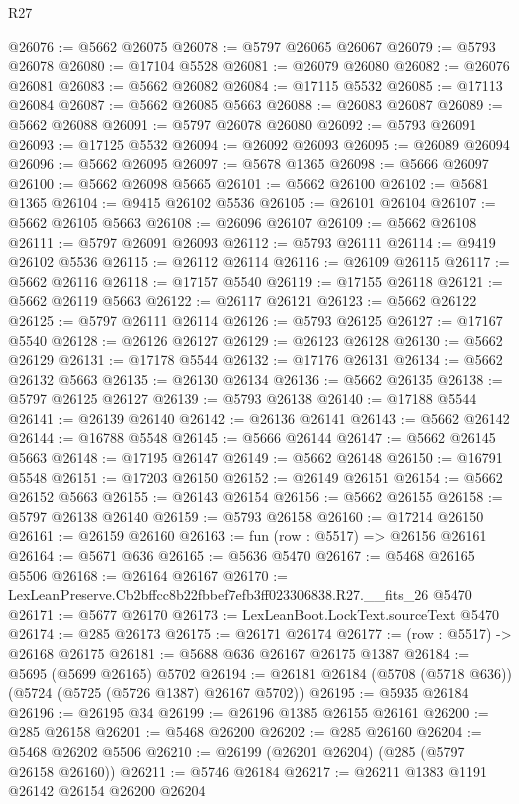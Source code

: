 \begin{lexlean}{R27}
\begin{coremodule}
@26076 := @5662 @26075
@26078 := @5797 @26065 @26067
@26079 := @5793 @26078
@26080 := @17104 @5528
@26081 := @26079 @26080
@26082 := @26076 @26081
@26083 := @5662 @26082
@26084 := @17115 @5532
@26085 := @17113 @26084
@26087 := @5662 @26085 @5663
@26088 := @26083 @26087
@26089 := @5662 @26088
@26091 := @5797 @26078 @26080
@26092 := @5793 @26091
@26093 := @17125 @5532
@26094 := @26092 @26093
@26095 := @26089 @26094
@26096 := @5662 @26095
@26097 := @5678 @1365
@26098 := @5666 @26097
@26100 := @5662 @26098 @5665
@26101 := @5662 @26100
@26102 := @5681 @1365
@26104 := @9415 @26102 @5536
@26105 := @26101 @26104
@26107 := @5662 @26105 @5663
@26108 := @26096 @26107
@26109 := @5662 @26108
@26111 := @5797 @26091 @26093
@26112 := @5793 @26111
@26114 := @9419 @26102 @5536
@26115 := @26112 @26114
@26116 := @26109 @26115
@26117 := @5662 @26116
@26118 := @17157 @5540
@26119 := @17155 @26118
@26121 := @5662 @26119 @5663
@26122 := @26117 @26121
@26123 := @5662 @26122
@26125 := @5797 @26111 @26114
@26126 := @5793 @26125
@26127 := @17167 @5540
@26128 := @26126 @26127
@26129 := @26123 @26128
@26130 := @5662 @26129
@26131 := @17178 @5544
@26132 := @17176 @26131
@26134 := @5662 @26132 @5663
@26135 := @26130 @26134
@26136 := @5662 @26135
@26138 := @5797 @26125 @26127
@26139 := @5793 @26138
@26140 := @17188 @5544
@26141 := @26139 @26140
@26142 := @26136 @26141
@26143 := @5662 @26142
@26144 := @16788 @5548
@26145 := @5666 @26144
@26147 := @5662 @26145 @5663
@26148 := @17195 @26147
@26149 := @5662 @26148
@26150 := @16791 @5548
@26151 := @17203 @26150
@26152 := @26149 @26151
@26154 := @5662 @26152 @5663
@26155 := @26143 @26154
@26156 := @5662 @26155
@26158 := @5797 @26138 @26140
@26159 := @5793 @26158
@26160 := @17214 @26150
@26161 := @26159 @26160
@26163 := fun (row : @5517) => @26156 @26161
@26164 := @5671 @636
@26165 := @5636 @5470
@26167 := @5468 @26165 @5506
@26168 := @26164 @26167
@26170 := LexLeanPreserve.Cb2bffcc8b22fbbef7efb3ff023306838.R27.__fits_26 @5470
@26171 := @5677 @26170
@26173 := LexLeanBoot.LockText.sourceText @5470
@26174 := @285 @26173
@26175 := @26171 @26174
@26177 := (row : @5517) -> @26168 @26175
@26181 := @5688 @636 @26167 @26175 @1387
@26184 := @5695 (@5699 @26165) @5702
@26194 := @26181 @26184 (@5708 (@5718 @636)) (@5724 (@5725 (@5726 @1387) @26167 @5702))
@26195 := @5935 @26184
@26196 := @26195 @34
@26199 := @26196 @1385 @26155 @26161
@26200 := @285 @26158
@26201 := @5468 @26200
@26202 := @285 @26160
@26204 := @5468 @26202 @5506
@26210 := @26199 (@26201 @26204) (@285 (@5797 @26158 @26160))
@26211 := @5746 @26184
@26217 := @26211 @1383 @1191 @26142 @26154 @26200 @26204

\end{coremodule}
\end{lexlean}
